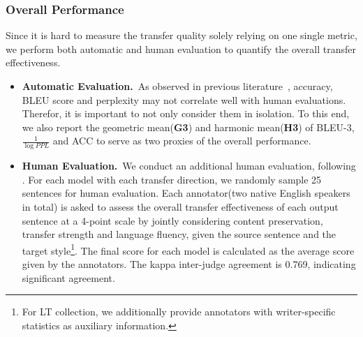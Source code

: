 \subsubsection*{Overall Performance}
Since it is hard to measure the transfer quality solely relying on one single metric, we perform both automatic and human evaluation to quantify the overall transfer effectiveness.
\begin{itemize}
	\item \textbf{Automatic Evaluation.}~As observed in previous literature~\citep{li2018delete,Sudhakar2020}, accuracy, BLEU score and perplexity may not correlate well with human evaluations. Therefor, it is important to not only consider them in isolation. To this end, we also report the geometric mean(\textbf{G3}) and harmonic mean(\textbf{H3}) of BLEU-3, $\frac{1}{\log{PPL}}$ and ACC to serve as two proxies of the overall performance.
	\item \textbf{Human Evaluation.}~We conduct an additional human evaluation, following \citet{luo2019dual}. For each model with each transfer direction, we randomly sample 25 sentences for human evaluation. Each annotator(two native English speakers in total) is asked to assess the overall transfer effectiveness of each output sentence at a 4-point scale by jointly considering content preservation, transfer strength and language fluency, given the source sentence and the target style\footnote{For LT collection, we additionally provide annotators with writer-specific statistics as auxiliary information.}.
	The final score for each model is calculated as the average score given by the annotators. The kappa inter-judge agreement is 0.769, indicating significant agreement.
\end{itemize}

